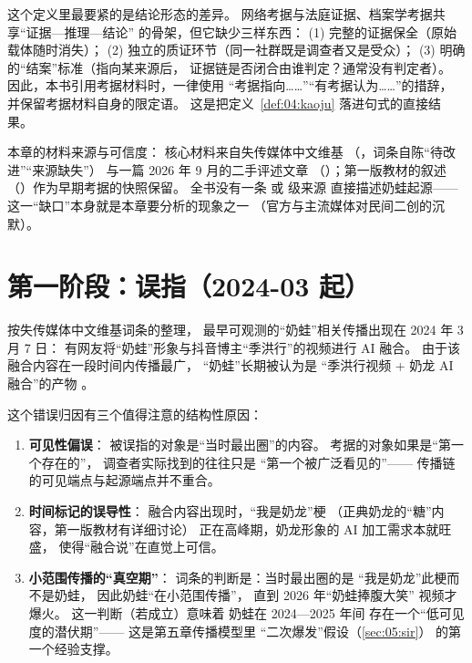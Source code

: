 这个定义里最要紧的是结论形态的差异。
网络考据与法庭证据、档案学考据共享“证据—推理—结论”
的骨架，但它缺少三样东西：
(1) 完整的证据保全（原始载体随时消失）；
(2) 独立的质证环节（同一社群既是调查者又是受众）；
(3) 明确的“结案”标准（指向某来源后，
证据链是否闭合由谁判定？通常没有判定者）。
因此，本书引用考据材料时，一律使用
“考据指向……”“有考据认为……”的措辞，
并保留考据材料自身的限定语。
这是把定义~\ref{def:04:kaoju} 落进句式的直接结果。

\begin{nlmethod}[研究方法提示]
  本章的材料来源与可信度：
  核心材料来自失传媒体中文维基
  （，词条自陈“待改进”“来源缺失”）
  与一篇 2026 年 9 月的二手评述文章
  （）；第一版教材的叙述
  （）作为早期考据的快照保留。
  全书没有一条  或  级来源
  直接描述奶蛙起源——
  这一“缺口”本身就是本章要分析的现象之一
  （官方与主流媒体对民间二创的沉默）。
\end{nlmethod}

\section{第一阶段：误指（2024-03 起）}\label{sec:04:mistaken}

按失传媒体中文维基词条的整理，
最早可观测的“奶蛙”相关传播出现在 2024 年 3 月 7 日：
有网友将“奶蛙”形象与抖音博主“季洪行”的视频进行
AI 融合\cite{lostmedia2026naiwa}。
由于该融合内容在一段时间内传播最广，
“奶蛙”长期被认为是
“季洪行视频 + 奶龙 AI 融合”的产物
\cite{lostmedia2026naiwa}。

这个错误归因有三个值得注意的结构性原因：

\begin{enumerate}[label=\arabic*.]
  \item \textbf{可见性偏误}：
        被误指的对象是“当时最出圈”的内容。
        考据的对象如果是“第一个存在的”，
        调查者实际找到的往往只是
        “第一个被广泛看见的”——
        传播链的可见端点与起源端点并不重合。
  \item \textbf{时间标记的误导性}：
        融合内容出现时，“我是奶龙”梗
        （正典奶龙的“糖”内容，第一版教材有详细讨论）
        正在高峰期，奶龙形象的
        AI 加工需求本就旺盛，
        使得“融合说”在直觉上可信。
  \item \textbf{小范围传播的“真空期”}：
        词条的判断是：当时最出圈的是
        “我是奶龙”此梗而不是奶蛙，
        因此奶蛙“在小范围传播”，
        直到 2026 年“奶蛙捧腹大笑”
        视频才爆火\cite{lostmedia2026naiwa}。
        这一判断（若成立）意味着
        奶蛙在 2024—2025 年间
        存在一个“低可见度的潜伏期”——
        这是第五章传播模型里
        “二次爆发”假设（\ref{sec:05:sir}）
        的第一个经验支撑。
\end{enumerate}

